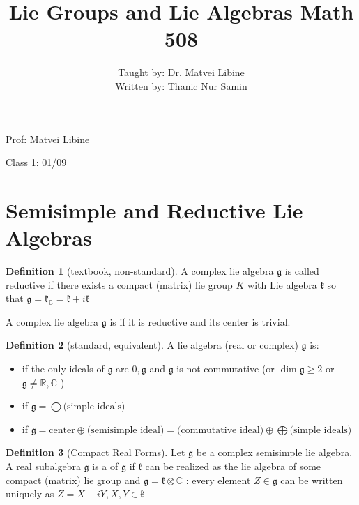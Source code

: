 \documentclass{article}
\title{Lie Groups and Lie Algebras Math 508}
\author{Taught by: Dr. Matvei Libine \\ Written by: Thanic Nur Samin}
\date{\vspace{-5ex}}
\theoremstyle{definition}
\newtheorem{definition}{Definition}
\begin{document}
\maketitle

Prof: Matvei Libine

Class 1: 01/09

\section*{Semisimple and Reductive Lie Algebras}

\begin{definition}[textbook, non-standard]
    A complex lie algebra \(\mathfrak{g} \) is called reductive if there exists a compact (matrix) lie group \(K\) with Lie algebra \(\mathfrak{k} \) so that \(\mathfrak{g} =\mathfrak{k} _\mathbb{C} =\mathfrak{k} +i\mathfrak{k} \)

    A complex lie algebra \(\mathfrak{g} \) is  if it is reductive and its center is trivial.
\end{definition}

\begin{definition}[standard, equivalent]
    A lie algebra (real or complex) \(\mathfrak{g} \) is:
    \begin{itemize}
        \item {} if the only ideals of \(\mathfrak{g} \) are \(0,\mathfrak{g} \) and \(\mathfrak{g} \) is not commutative (or \(\dim\mathfrak{g} \geq 2\) or \(\mathfrak{g} \neq \mathbb{R} ,\mathbb{C} \) )
        \item {} if \(\mathfrak{g} =\bigoplus \text{(simple ideals)} \) 
        \item {} if \(\mathfrak{g}=\text{center} \oplus \text{(semisimple ideal)} =\text{(commutative ideal)} \oplus \bigoplus \text{(simple ideals)} \) 
    \end{itemize}
\end{definition}

\begin{definition}[Compact Real Forms]
    Let \(\mathfrak{g}\) be a complex semisimple lie algebra. A real subalgebra \(\mathfrak{g} \) is a  of \(\mathfrak{g} \) if \(\mathfrak{k} \) can be realized as the lie algebra of some compact (matrix) lie group and \(\mathfrak{g} =\mathfrak{k} \otimes \mathbb{C} \) : every element \(Z\in \mathfrak{g} \) can be written uniquely as  \(Z=X+iY, X,Y\in \mathfrak{k} \) 
\end{definition}
\end{document}
